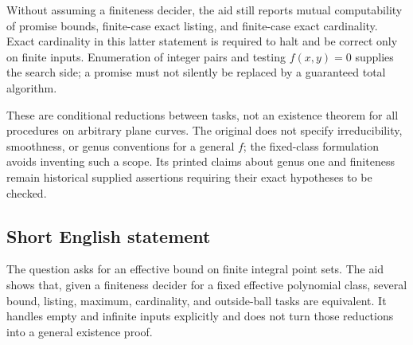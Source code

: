 \documentclass[11pt]{article}
\begin{document}
Without assuming a finiteness decider, the aid still reports mutual computability of promise bounds, finite-case exact listing, and finite-case exact cardinality. Exact cardinality in this latter statement is required to halt and be correct only on finite inputs. Enumeration of integer pairs and testing \(f(x,y)=0\) supplies the search side; a promise must not silently be replaced by a guaranteed total algorithm.

These are conditional reductions between tasks, not an existence theorem for all procedures on arbitrary plane curves. The original does not specify irreducibility, smoothness, or genus conventions for a general \(f\); the fixed-class formulation avoids inventing such a scope. Its printed claims about genus one and finiteness remain historical supplied assertions requiring their exact hypotheses to be checked.
\subsection{Short English statement}
The question asks for an effective bound on finite integral point sets. The aid shows that, given a finiteness decider for a fixed effective polynomial class, several bound, listing, maximum, cardinality, and outside-ball tasks are equivalent. It handles empty and infinite inputs explicitly and does not turn those reductions into a general existence proof.
\end{document}
